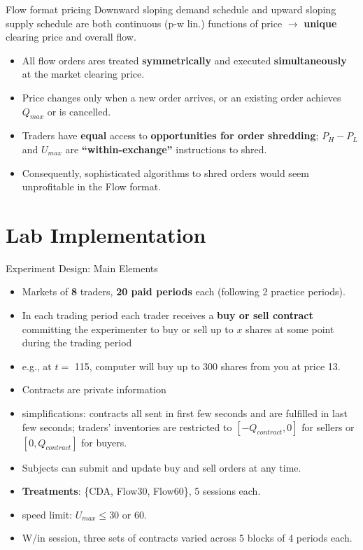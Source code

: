 \documentclass[10pt]{beamer}
\begin{document}
\begin{frame}{Flow format pricing}
Downward sloping demand schedule and upward sloping supply schedule are both continuous (p-w lin.) functions of price $\rightarrow$ \textbf{unique} clearing price and overall flow. \pause
\begin{itemize}
\item All flow orders ares treated \textbf{symmetrically} and executed \textbf{simultaneously} at the market clearing price. \pause
\item Price changes only when a new order arrives, or an existing order achieves $Q_{max}$ or is cancelled.
\item Traders have \textbf{equal} access to \textbf{opportunities for order shredding}; $P_H - P_L$ and $U_{max}$ are  \textbf{``within-exchange''}
instructions to shred. \pause
\item Consequently, sophisticated algorithms to shred orders would seem unprofitable in the Flow format.
    \end{itemize} %
\end{frame}


\section{Lab Implementation}

\begin{frame}{Experiment Design: Main Elements}
    \begin{itemize}
        \item Markets of \textbf{8} traders, \textbf{20 paid periods} each (following 2 practice periods). \pause
        \item In each trading period each trader receives a \textbf{buy or sell contract} committing the experimenter to buy or sell up to $x$ shares at some point during the trading period 
        \item e.g., at $t=$ 115, computer will buy up to 300 shares from you at price 13. 
        \item Contracts are private information \pause
        \item simplifications: contracts all sent in first few seconds and are fulfilled in last few seconds; traders' inventories are restricted to $[-Q_{contract}, 0]$ for sellers or $[0, Q_{contract}]$ for buyers.
        \item Subjects can submit and update buy and sell orders at any time. \pause
        \item \textbf{Treatments}: \{CDA, Flow30, Flow60\}, 5 sessions each. 
        \item speed limit: $U_{max} \leq 30$ or 60.
        \item W/in session, three sets of contracts varied across 5 blocks of 4 periods each. 
    \end{itemize}
\end{frame}
\end{document}
